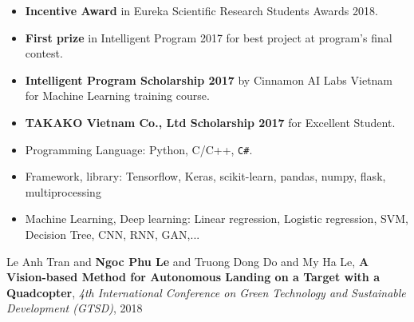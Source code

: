 %
\smallskip
\begin{itemize}
\item \textbf{Incentive Award} in Eureka Scientific Research Students Awards 2018.
\smallskip

\item \textbf{First prize} in Intelligent Program 2017 for best project at program's final contest.
\smallskip
\item \textbf{Intelligent Program Scholarship 2017} by Cinnamon AI Labs Vietnam for Machine Learning training course.
\smallskip
\item \textbf{TAKAKO Vietnam Co., Ltd Scholarship 2017} for Excellent Student.
\end{itemize}

\smallskip
\begin{itemize}
\item Programming Language: Python, C/C++, \texttt{C\#}.
\smallskip
\item Framework, library: Tensorflow, Keras, scikit-learn, pandas, numpy, flask, multiprocessing
\smallskip
\item Machine Learning, Deep learning: Linear regression, Logistic regression, SVM, Decision Tree, CNN, RNN, GAN,...
\end{itemize}


Le Anh Tran and \textbf{Ngoc Phu Le} and Truong Dong Do and My Ha Le, \textbf{A Vision-based Method for Autonomous Landing on a Target with a Quadcopter}, \textit{4th International Conference on Green Technology and Sustainable Development (GTSD)}, 2018




